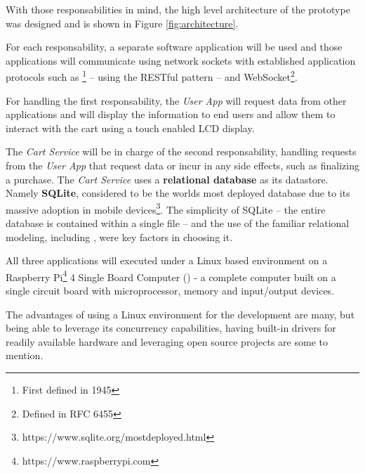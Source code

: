 \documentclass[openright]{normas-utf-tex} %
\begin{document}
With those responsabilities in mind, the high level architecture of the prototype
was designed and is shown in Figure \ref{fig:architecture}.

For each responsability, a separate software application will be used and those
applications will communicate using 
network sockets \cite{Kurose2013} with established application protocols such as
\footnote{First defined in
 1945} -- using the RESTful pattern -- and
WebSocket\footnote{Defined in RFC 6455}.

For handling the first responsability, the \textit{User App} will request data
from other applications and will display the information to end users and allow
them to interact with the cart using a touch enabled LCD display.

The \textit{Cart Service} will be in charge of the second responsability,
handling requests from the \textit{User App} that request data or incur in any
side effects, such as finalizing a purchase. The \textit{Cart Service} uses a
\textbf{relational database} \cite{Silberschatz2010} as its datastore. Namely
\textbf{SQLite}, considered to be the worlds most deployed database due to its
massive adoption in mobile
devices\footnote{https://www.sqlite.org/mostdeployed.html}. The simplicity of
SQLite -- the entire database is contained within a single file --  and the use of
the familiar relational modeling, including  \cite{Nield2016}, were key factors in choosing
it.

All three applications will executed under a Linux \cite{Tanenbaum2015} based environment on a Raspberry Pi\footnote{https://www.raspberrypi.com} 4 Single Board
Computer () - a complete computer built on a single circuit board with microprocessor, memory and input/output devices.

The advantages of using a Linux environment for the development are many, but
being able to leverage its concurrency capabilities, having built-in drivers
for readily available hardware and leveraging open source projects are some to
mention.
\end{document}
